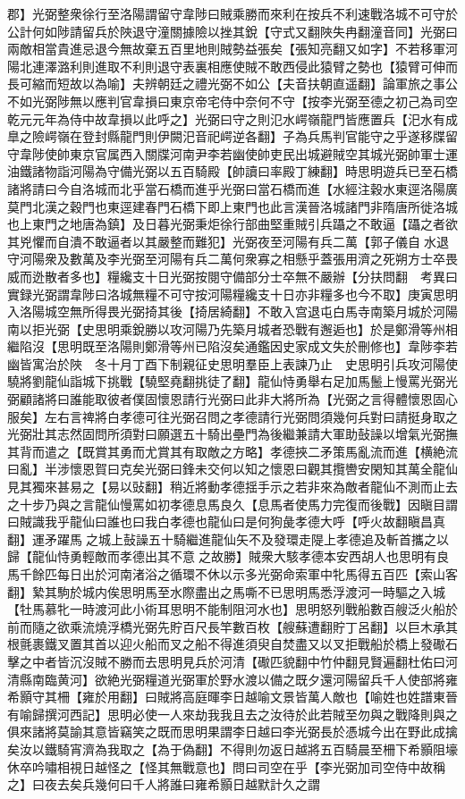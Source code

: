 郡】光弼整衆徐行至洛陽謂留守韋陟曰賊乘勝而來利在按兵不利速戰洛城不可守於公計何如陟請留兵於陜退守潼關據險以挫其銳【守式又翻陜失冉翻潼音同】光弼曰兩敵相當貴進忌退今無故棄五百里地則賊勢益張矣【張知亮翻又如字】不若移軍河陽北連澤潞利則進取不利則退守表裏相應使賊不敢西侵此猿臂之勢也【猿臂可伸而長可縮而短故以為喻】夫辨朝廷之禮光弼不如公【夫音扶朝直遥翻】論軍旅之事公不如光弼陟無以應判官韋損曰東京帝宅侍中奈何不守【按李光弼至德之初己為司空乾元元年為侍中故韋損以此呼之】光弼曰守之則氾水崿嶺龍門皆應置兵【汜水有成臯之險崿嶺在登封縣龍門則伊闕汜音祀崿逆各翻】子為兵馬判官能守之乎遂移牒留守韋陟使帥東京官属西入關牒河南尹李若幽使帥吏民出城避賊空其城光弼帥軍士運油鐵諸物詣河陽為守備光弼以五百騎殿【帥讀曰率殿丁練翻】時思明遊兵已至石橋諸將請曰今自洛城而北乎當石橋而進乎光弼曰當石橋而進【水經注穀水東逕洛陽廣莫門北漢之穀門也東逕建春門石橋下即上東門也此言漢晉洛城諸門非隋唐所徙洛城也上東門之地唐為鎮】及日暮光弼秉炬徐行部曲堅重賊引兵躡之不敢逼【躡之者欲其兇懼而自潰不敢逼者以其嚴整而難犯】光弼夜至河陽有兵二萬【郭子儀自水退守河陽衆及數萬及李光弼至河陽有兵二萬何衆寡之相懸乎蓋張用濟之死朔方士卒畏威而迯散者多也】糧纔支十日光弼按閱守備部分士卒無不嚴辦【分扶問翻　考異曰實録光弼謂韋陟曰洛城無糧不可守按河陽糧纔支十日亦非糧多也今不取】庚寅思明入洛陽城空無所得畏光弼掎其後【掎居綺翻】不敢入宫退屯白馬寺南築月城於河陽南以拒光弼【史思明乘銳勝以攻河陽乃先築月城者恐戰有邂逅也】於是鄭滑等州相繼陷沒【思明既至洛陽則鄭滑等州已陷沒矣通鑑因史家成文失於刪修也】韋陟李若幽皆寓治於陜　冬十月丁酉下制親征史思明羣臣上表諫乃止　史思明引兵攻河陽使驍將劉龍仙詣城下挑戰【驍堅堯翻挑徒了翻】龍仙恃勇舉右足加馬鬛上慢罵光弼光弼顧諸將曰誰能取彼者僕固懷恩請行光弼曰此非大將所為【光弼之言得體懷恩固心服矣】左右言禆將白孝德可往光弼召問之孝德請行光弼問須幾何兵對曰請挺身取之光弼壯其志然固問所須對曰願選五十騎出壘門為後繼兼請大軍助鼔譟以增氣光弼撫其背而遣之【既賞其勇而尤賞其有取敵之方略】孝德挾二矛策馬亂流而進【横絶流曰亂】半涉懷恩賀曰克矣光弼曰鋒未交何以知之懷恩曰觀其攬轡安閑知其萬全龍仙見其獨來甚易之【易以䜴翻】稍近將動孝德揺手示之若非來為敵者龍仙不測而止去之十步乃與之言龍仙慢罵如初孝德息馬良久【息馬者使馬力完復而後戰】因瞋目謂曰賊識我乎龍仙曰誰也曰我白孝德也龍仙曰是何狗彘孝德大呼【呼火故翻瞋昌真翻】運矛躍馬之城上鼔譟五十騎繼進龍仙矢不及發環走隄上孝德追及斬首攜之以歸【龍仙恃勇輕敵而孝德出其不意之故勝】賊衆大駭孝德本安西胡人也思明有良馬千餘匹每日出於河南渚浴之循環不休以示多光弼命索軍中牝馬得五百匹【索山客翻】縶其駒於城内俟思明馬至水際盡出之馬嘶不已思明馬悉浮渡河一時驅之入城【牡馬慕牝一時渡河此小術耳思明不能制阻河水也】思明怒列戰船數百艘泛火船於前而隨之欲乘流燒浮橋光弼先貯百尺長竿數百枚【艘蘇遭翻貯丁呂翻】以巨木承其根氈裹鐵叉置其首以迎火船而叉之船不得進須臾自焚盡又以叉拒戰船於橋上發礮石擊之中者皆沉沒賊不勝而去思明見兵於河清【礮匹貌翻中竹仲翻見賢遍翻杜佑曰河清縣南臨黄河】欲絶光弼糧道光弼軍於野水渡以備之既夕還河陽留兵千人使部將雍希顥守其柵【雍於用翻】曰賊將高庭暉李日越喻文景皆萬人敵也【喻姓也姓譜東晉有喻歸撰河西記】思明必使一人來劫我我且去之汝待於此若賊至勿與之戰降則與之俱來諸將莫諭其意皆竊笑之既而思明果謂李日越曰李光弼長於憑城今出在野此成擒矣汝以鐵騎宵濟為我取之【為于偽翻】不得則勿返日越將五百騎晨至柵下希顥阻壕休卒吟嘯相視日越怪之【怪其無戰意也】問曰司空在乎【李光弼加司空侍中故稱之】曰夜去矣兵幾何曰千人將誰曰雍希顥日越默計久之謂